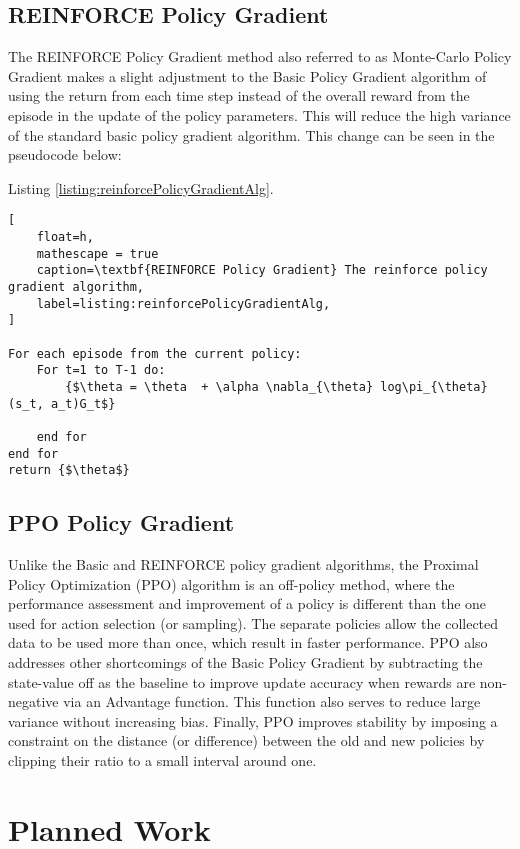 \documentclass[conference]{IEEEtran}
\begin{document}
\subsection{REINFORCE Policy Gradient}
The REINFORCE Policy Gradient method also referred to as Monte-Carlo Policy Gradient makes a slight adjustment to the Basic Policy Gradient algorithm of using the return from each time step instead of the overall reward from the episode in the update of the policy parameters. This will reduce the high variance of the standard basic policy gradient algorithm.
This change can be seen in the pseudocode below:

Listing \ref{listing:reinforcePolicyGradientAlg}.

\begin{lstlisting}[
    float=h,
    mathescape = true
    caption=\textbf{REINFORCE Policy Gradient} The reinforce policy gradient algorithm,
    label=listing:reinforcePolicyGradientAlg,
]

For each episode from the current policy:
    For t=1 to T-1 do:
        {$\theta = \theta  + \alpha \nabla_{\theta} log\pi_{\theta}(s_t, a_t)G_t$}

    end for
end for
return {$\theta$}
\end{lstlisting}

\subsection{PPO Policy Gradient}
Unlike the Basic and REINFORCE policy gradient algorithms, the Proximal Policy Optimization (PPO) algorithm is an off-policy method, where the performance assessment and improvement of a policy is different than the one used for action selection (or sampling). The separate policies allow the collected data to be used more than once, which result in faster performance. PPO also addresses other shortcomings of the Basic Policy Gradient by subtracting the state-value off as the baseline to improve update accuracy when rewards are non-negative via an Advantage function. This function also serves to reduce large variance without increasing bias. Finally, PPO improves stability by imposing a constraint on the distance (or difference) between the old and new policies by clipping their ratio to a small interval around one.

\section{Planned Work} \label{planned}
\end{document}
